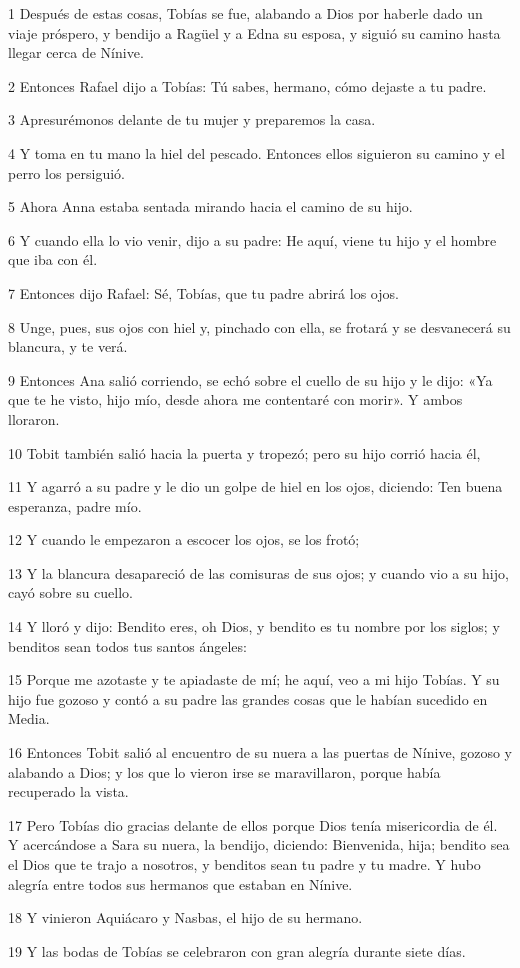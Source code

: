 \par 1 Después de estas cosas, Tobías se fue, alabando a Dios por haberle dado un viaje próspero, y bendijo a Ragüel y a Edna su esposa, y siguió su camino hasta llegar cerca de Nínive.
\par 2 Entonces Rafael dijo a Tobías: Tú sabes, hermano, cómo dejaste a tu padre.
\par 3 Apresurémonos delante de tu mujer y preparemos la casa.
\par 4 Y toma en tu mano la hiel del pescado. Entonces ellos siguieron su camino y el perro los persiguió.
\par 5 Ahora Anna estaba sentada mirando hacia el camino de su hijo.
\par 6 Y cuando ella lo vio venir, dijo a su padre: He aquí, viene tu hijo y el hombre que iba con él.
\par 7 Entonces dijo Rafael: Sé, Tobías, que tu padre abrirá los ojos.
\par 8 Unge, pues, sus ojos con hiel y, pinchado con ella, se frotará y se desvanecerá su blancura, y te verá.
\par 9 Entonces Ana salió corriendo, se echó sobre el cuello de su hijo y le dijo: «Ya que te he visto, hijo mío, desde ahora me contentaré con morir». Y ambos lloraron.
\par 10 Tobit también salió hacia la puerta y tropezó; pero su hijo corrió hacia él,
\par 11 Y agarró a su padre y le dio un golpe de hiel en los ojos, diciendo: Ten buena esperanza, padre mío.
\par 12 Y cuando le empezaron a escocer los ojos, se los frotó;
\par 13 Y la blancura desapareció de las comisuras de sus ojos; y cuando vio a su hijo, cayó sobre su cuello.
\par 14 Y lloró y dijo: Bendito eres, oh Dios, y bendito es tu nombre por los siglos; y benditos sean todos tus santos ángeles:
\par 15 Porque me azotaste y te apiadaste de mí; he aquí, veo a mi hijo Tobías. Y su hijo fue gozoso y contó a su padre las grandes cosas que le habían sucedido en Media.
\par 16 Entonces Tobit salió al encuentro de su nuera a las puertas de Nínive, gozoso y alabando a Dios; y los que lo vieron irse se maravillaron, porque había recuperado la vista.
\par 17 Pero Tobías dio gracias delante de ellos porque Dios tenía misericordia de él. Y acercándose a Sara su nuera, la bendijo, diciendo: Bienvenida, hija; bendito sea el Dios que te trajo a nosotros, y benditos sean tu padre y tu madre. Y hubo alegría entre todos sus hermanos que estaban en Nínive.
\par 18 Y vinieron Aquiácaro y Nasbas, el hijo de su hermano.
\par 19 Y las bodas de Tobías se celebraron con gran alegría durante siete días.

